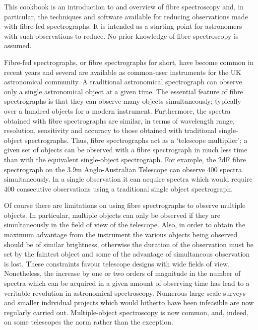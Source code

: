 \documentclass[twoside,11pt]{article}
\begin{document}
This cookbook is an introduction to and overview of fibre spectroscopy
and, in particular, the techniques and software available for reducing
observations made with fibre-fed spectrographs.  It is intended as a
starting point for astronomers with such observations to reduce.  No prior
knowledge of fibre spectroscopy is assumed.

Fibre-fed spectrographs, or fibre spectrographs for short, have become
common in recent years and several are available as common-user
instruments for the UK astronomical community.  A traditional
astronomical spectrograph can observe only a single astronomical object
at a given time.  The essential feature of fibre spectrographs is that
they can observe many objects simultaneously; typically over a hundred
objects for a modern instrument.  Furthermore, the spectra obtained with
fibre spectrographs are similar, in terms of wavelength range, resolution,
sensitivity and accuracy to those obtained with traditional single-object
spectrographs.  Thus, fibre spectrographs act as a `telescope multiplier';
a given set of objects can be observed with a fibre spectrograph in much
less time than with the equivalent single-object spectrograph.  For
example, the 2dF fibre spectrograph on the 3.9m Anglo-Australian Telescope
can observe 400 spectra simultaneously.  In a single observation it can
acquire spectra which would require 400 consecutive observations using a
traditional single object spectrograph.

Of course there are limitations on using fibre spectrographs to observe
multiple objects.  In particular, multiple objects can only be observed if
they are simultaneously in the field of view of the telescope.  Also, in
order to obtain the maximum advantage from the instrument the various
objects being observed should be of similar brightness, otherwise the
duration of the observation must be set by the faintest object and some
of the advantage of simultaneous observation is lost.  These constraints
favour telescope designs with wide fields of view.  Nonetheless, the
increase by one or two orders of magnitude in the number of spectra which
can be acquired in a given amount of observing time has lead to a
veritable revolution in astronomical spectroscopy.  Numerous large scale
surveys and smaller individual projects which would hitherto have been
infeasible are now regularly carried out.  Multiple-object spectroscopy
is now common, and, indeed, on some telescopes the norm rather than the
exception.
\end{document}
